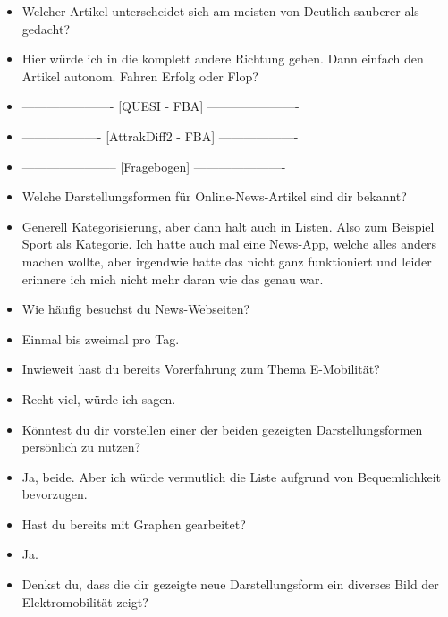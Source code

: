 {\begin{itemize}[]
                  Man könnte auch weiter nach oben gehen zu Industrie, aber würde dann eine Kategorie verlieren.
                  Deswegen gehe ich mal weiter nach unten.
                  Also von mir aus einfach \flqq Rohstoffe für E-Auto Akku\frqq{}.
            \item {} Welcher Artikel unterscheidet sich am meisten von \flqq Deutlich sauberer als gedacht\frqq{}?
            \item {} Hier würde ich in die komplett andere Richtung gehen.
                  Dann einfach den Artikel \flqq autonom. Fahren Erfolg oder Flop?\frqq{}
            \item {----------------------} [QUESI - FBA] {----------------------}
            \item {-------------------} [AttrakDiff2 - FBA] {-------------------}
            \item {-----------------------} [Fragebogen] {----------------------}
            \item {} Welche Darstellungsformen für Online-News-Artikel sind dir bekannt?
            \item {} Generell Kategorisierung, aber dann halt auch in Listen. Also zum Beispiel Sport als Kategorie.
                  Ich hatte auch mal eine News-App, welche alles anders machen wollte, aber irgendwie hatte das nicht ganz funktioniert und leider erinnere ich mich nicht mehr daran wie das genau war.
            \item {} Wie häufig besuchst du News-Webseiten?
            \item {} Einmal bis zweimal pro Tag.
            \item {} Inwieweit hast du bereits Vorerfahrung zum Thema E-Mobilität?
            \item {} Recht viel, würde ich sagen.
            \item {} Könntest du dir vorstellen einer der beiden gezeigten Darstellungsformen persönlich zu nutzen?
            \item {} Ja, beide. Aber ich würde vermutlich die Liste aufgrund von Bequemlichkeit bevorzugen.
            \item {} Hast du bereits mit Graphen gearbeitet?
            \item {} Ja.
            \item {} Denkst du, dass die dir gezeigte neue Darstellungsform ein diverses Bild der Elektromobilität zeigt?

\end{itemize}}
